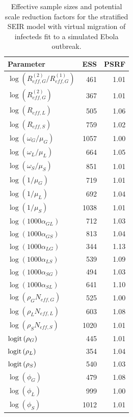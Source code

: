 \begin{table}[htbp]
	\caption{Effective sample sizes and potential scale reduction factors for the stratified SEIR model with virtual migration of infecteds fit to a simulated Ebola outbreak.}
	\centering
	\begin{tabular}{lrr}
		\hline
		\textbf{Parameter} & \textbf{ESS} & \textbf{PSRF} \\ 
		\hline
		$ \log\left (R_{eff,G}^{(2)} / R_{eff,G}^{(1)}\right ) $& 461 & 1.01 \\ 
		$ \log\left (R_{eff,G}^{(2)}\right ) $& 367 & 1.01 \\ 
		$ \log\left (R_{eff,L}\right ) $& 505 & 1.06 \\ 
		$ \log\left (R_{eff,S}\right ) $& 759 & 1.02 \\ 
		$ \log\left (\omega_G / \mu_G\right ) $& 1057 & 1.00 \\ 
		$ \log\left (\omega_L / \mu_L\right ) $& 664 & 1.05 \\ 
		$ \log\left (\omega_S / \mu_S\right ) $& 851 & 1.01 \\ 
		$ \log\left (1/\mu_G\right ) $& 719 & 1.01 \\ 
		$ \log\left (1/\mu_L\right ) $& 692 & 1.04 \\ 
		$ \log\left (1/\mu_S\right ) $& 1038 & 1.01 \\ 
		$ \log\left (1000\alpha_{GL}\right ) $& 712 & 1.03 \\ 
		$ \log\left (1000\alpha_{GS}\right ) $& 813 & 1.04 \\ 
		$ \log\left (1000\alpha_{LG}\right ) $& 344 & 1.13 \\ 
		$ \log\left (1000\alpha_{LS}\right ) $& 539 & 1.09 \\ 
		$ \log\left (1000\alpha_{SG}\right ) $& 494 & 1.03 \\ 
		$ \log\left (1000\alpha_{SL}\right ) $& 641 & 1.10 \\ 
		$ \log\left (\rho_GN_{eff,G}\right ) $& 525 & 1.00 \\ 
		$ \log\left (\rho_LN_{eff,L}\right ) $& 603 & 1.08 \\ 
		$ \log\left (\rho_SN_{eff,S}\right ) $& 1020 & 1.01 \\ 
		$ \mathrm{logit}\left (\rho_G\right ) $& 445 & 1.01 \\ 
		$ \mathrm{logit}\left (\rho_L\right ) $& 354 & 1.04 \\ 
		$ \mathrm{logit}\left (\rho_S\right ) $& 540 & 1.03 \\ 
		$ \log(\phi_G) $& 479 & 1.08 \\ 
		$ \log(\phi_L) $& 999 & 1.00 \\ 
		$ \log(\phi_S) $& 1012 & 1.01 \\ 
		\hline
	\end{tabular}
\end{table}

